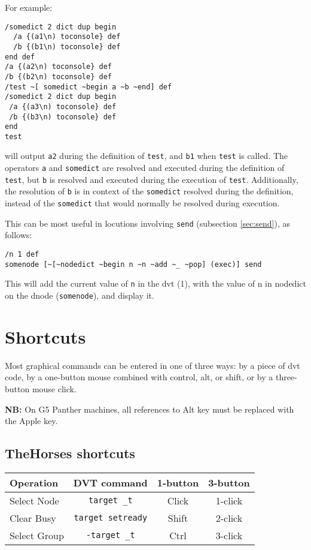 \documentclass[12pt]{article}
\begin{document}
For example:\samepage
\begin{verbatim}
/somedict 2 dict dup begin 
  /a {(a1\n) toconsole} def 
  /b {(b1\n) toconsole} def 
end def
/a {(a2\n) toconsole} def 
/b {(b2\n) toconsole} def 
/test ~[ somedict ~begin a ~b ~end] def
/somedict 2 dict dup begin 
 /a {(a3\n) toconsole} def 
 /b {(b3\n) toconsole} def 
end
test
\end{verbatim}
will output \verb$a2$ during the definition of \verb$test$, and
\verb$b1$ when \verb$test$ is called. The operators \verb$a$ and
\verb$somedict$ are resolved and executed during the definition of
\verb$test$, but \verb$b$ is resolved and executed during the
execution of \verb$test$.  Additionally, the resolution of \verb$b$ is
in context of the \verb$somedict$ resolved during the definition,
instead of the \verb$somedict$ that would normally be resolved during
execution.

This can be most useful in locutions involving \verb$send$ (subsection
\ref{sec:send}), as follows:\samepage
\begin{verbatim}
/n 1 def
somenode [~[~nodedict ~begin n ~n ~add ~_ ~pop] (exec)] send
\end{verbatim}

This will add the current value of \verb$n$ in the dvt (1), with the value
of n in nodedict on the dnode (\verb$somenode$), and display it.

\section{Shortcuts}
\label{sec:short}

Most graphical commands can be entered in one of three ways: by a
piece of dvt code, by a one-button mouse combined with control, alt,
or shift, or by a three-button mouse click.

\textbf{NB:} On G5 Panther machines, all references to Alt key must be
replaced with the Apple key.

\subsection{TheHorses shortcuts}
\label{sec:shorthorses}

\begin{tabular}{|l|c|c|c|}
  \hline
  Operation & DVT command & 1-button & 3-button \\
  \hline
  Select Node & \verb$target _t$ & Click & 1-click \\
  Clear Busy & \verb$target setready$ & Shift & 2-click \\
  Select Group & \verb$-target _t$ & Ctrl & 3-click \\
  \hline
\end{tabular}
\end{document}
